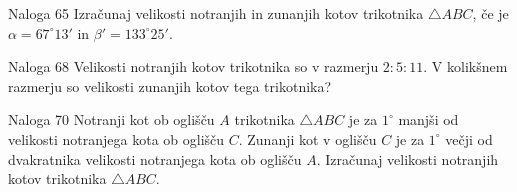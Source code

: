         \begin{frame}
            \begin{exampleblock}{Naloga 65}
                Izračunaj velikosti notranjih in zunanjih kotov trikotnika $\triangle ABC$, če je $\alpha= 67^\circ 13'$ in $\beta' = 133^\circ 25'$.
            \end{exampleblock}

            \pause
            \begin{exampleblock}{Naloga 68}
                Velikosti notranjih kotov trikotnika so v razmerju $2:5:11$. V kolikšnem razmerju so velikosti zunanjih kotov tega trikotnika?
            \end{exampleblock}

            \pause
            \begin{exampleblock}{Naloga 70}
                Notranji kot ob oglišču $A$ trikotnika $\triangle ABC$ je za $1^\circ$ manjši od velikosti notranjega kota ob oglišču $C$.  Zunanji kot v oglišču $C$ je za $1^\circ$ večji od dvakratnika velikosti notranjega kota ob oglišču $A$. Izračunaj velikosti notranjih kotov trikotnika $\triangle ABC$.
            \end{exampleblock}
        \end{frame}
        

